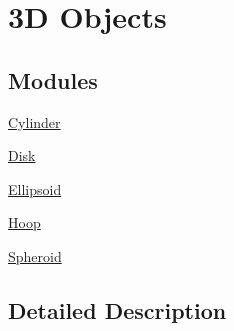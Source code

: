 \hypertarget{group___e_g_x_math-_geometry-3_d}{}\section{3D Objects}
\label{group___e_g_x_math-_geometry-3_d}
\subsection*{Modules}
\begin{DoxyCompactItemize}
\item 
\mbox{\hyperlink{group___e_g_x_math-_geometry-3_d-_cylinder}{Cylinder}}
\item 
\mbox{\hyperlink{group___e_g_x_math-_geometry-3_d-_disk}{Disk}}
\item 
\mbox{\hyperlink{group___e_g_x_math-_geometry-3_d-_ellipsoid}{Ellipsoid}}
\item 
\mbox{\hyperlink{group___e_g_x_math-_geometry-3_d-_hoop}{Hoop}}
\item 
\mbox{\hyperlink{group___e_g_x_math-_geometry-3_d-_spheroid}{Spheroid}}
\end{DoxyCompactItemize}


\subsection{Detailed Description}
